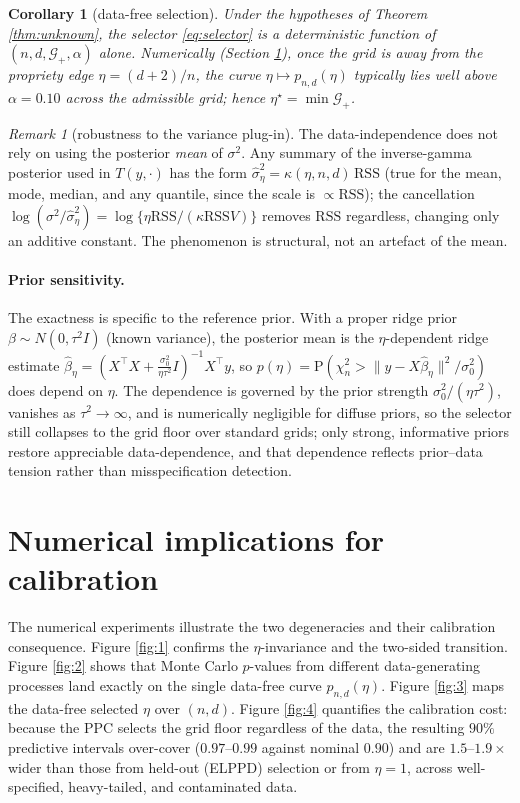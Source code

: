\documentclass[11pt]{article}
\newtheorem{corollary}{Corollary}
\theoremstyle{remark}
\newtheorem{remark}{Remark}
\newcommand{\RSS}{\mathrm{RSS}}
\newcommand{\Prob}{\mathrm{P}}
\newcommand{\bbeta}{\beta}
\newcommand{\bhat}{\hat{\bbeta}}
\newcommand{\chisq}{\chi^2}
\begin{document}
\begin{corollary}[data-free selection]\label{cor:datafree}
Under the hypotheses of Theorem \ref{thm:unknown}, the selector \eqref{eq:selector} is a deterministic function
of $(n,d,\mathcal G_+,\alpha)$ alone. Numerically (Section \ref{sec:num}), once the grid is away from the propriety
edge $\eta=(d+2)/n$, the curve $\eta\mapsto p_{n,d}(\eta)$ typically lies well above $\alpha=0.10$ across the
admissible grid; hence $\eta^\star=\min\mathcal G_+$.
\end{corollary}

\begin{remark}[robustness to the variance plug-in]\label{rem:plugin}
The data-independence does not rely on using the posterior \emph{mean} of $\sigma^2$. Any summary of the
inverse-gamma posterior used in $T(y,\cdot)$ has the form $\hat\sigma^2_\eta=\kappa(\eta,n,d)\,\RSS$ (true for
the mean, mode, median, and any quantile, since the scale is $\propto\RSS$); the cancellation
$\log(\sigma^2/\hat\sigma^2_\eta)=\log\{\eta\RSS/(\kappa\RSS V)\}$ removes $\RSS$ regardless, changing only an
additive constant. The phenomenon is structural, not an artefact of the mean.
\end{remark}

\paragraph{Prior sensitivity.} The exactness is specific to the reference prior. With a proper ridge prior
$\bbeta\sim N(0,\tau^2 I)$ (known variance), the posterior mean is the $\eta$-dependent ridge estimate
$\bhat_\eta=(X^\top X+\tfrac{\sigma_0^2}{\eta\tau^2}I)^{-1}X^\top y$, so
$p(\eta)=\Prob(\chisq_n>\lVert y-X\bhat_\eta\rVert^2/\sigma_0^2)$ does depend on $\eta$. The dependence is
governed by the prior strength $\sigma_0^2/(\eta\tau^2)$, vanishes as $\tau^2\to\infty$, and is numerically
negligible for diffuse priors, so the selector still collapses to the grid floor over standard grids; only
strong, informative priors restore appreciable data-dependence, and that dependence reflects prior--data tension
rather than misspecification detection.

\section{Numerical implications for calibration}\label{sec:num}
The numerical experiments illustrate the two degeneracies and their calibration consequence. Figure \ref{fig:1}
confirms the $\eta$-invariance and the two-sided transition. Figure \ref{fig:2} shows that Monte Carlo $p$-values
from different data-generating processes land exactly on the single data-free curve $p_{n,d}(\eta)$. Figure
\ref{fig:3} maps the data-free selected $\eta$ over $(n,d)$. Figure \ref{fig:4} quantifies the calibration cost:
because the PPC selects the grid floor regardless of the data, the resulting $90\%$ predictive intervals over-cover
($0.97$--$0.99$ against nominal $0.90$) and are $1.5$--$1.9\times$ wider than those from held-out (ELPPD) selection
or from $\eta=1$, across well-specified, heavy-tailed, and contaminated data.
\end{document}
